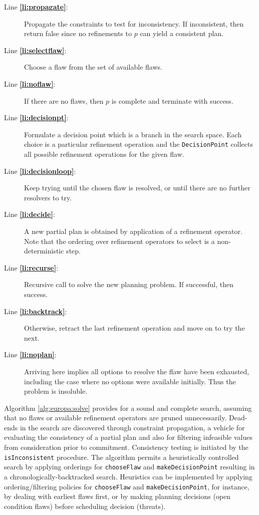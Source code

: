\begin{description}

\item[Line \textbf{\ref{li:propagate}}:] Propagate the constraints to
  test for inconsistency. If inconsistent, then return false since no
  refinements to $p$ can yield a consistent plan.

\item[Line \textbf{\ref{li:selectflaw}}:] Choose a flaw from the set
  of available flaws.

\item[Line \textbf{\ref{li:noflaw}}:] If there are no flaws, then $p$
  is complete and terminate with success.

\item[Line \textbf{\ref{li:decisionpt}}:] Formulate a decision point
  which is a branch in the search space. Each choice is a particular
  refinement operation and the \texttt{DecisionPoint} collects all
  possible refinement operations for the given flaw.

\item[Line \textbf{\ref{li:decisionloop}}:] Keep trying until the
  chosen flaw is resolved, or until there are no further resolvers to
  try.

\item[Line \textbf{\ref{li:decide}}:] A new partial plan is obtained
  by application of a refinement operator. Note that the ordering over
  refinement operators to select is a non-deterministic step.

\item[Line \textbf{\ref{li:recurse}}:] Recursive call to solve the
  new planning problem. If successful, then success.

\item[Line \textbf{\ref{li:backtrack}}:] Otherwise, retract the last
  refinement operation and move on to try the next.

\item[Line \textbf{\ref{li:noplan}}:] Arriving here implies all
  options to resolve the flaw have been exhausted, including the case
  where no options were available initially. Thus the problem is
  insoluble.

\end{description}

Algorithm \ref{alg:europa:solve} provides for a sound and complete
search, assuming that no flaws or available refinement operators are
pruned unnecessarily.  Dead-ends in the search are discovered through
constraint propagation, a vehicle for evaluating the consistency of a
partial plan and also for filtering infeasible values from
consideration prior to commitment. Consistency testing is initiated by
the \texttt{isInconsistent} procedure.  The algorithm permits a
heuristically controlled search by applying orderings for
\texttt{chooseFlaw} and \texttt{makeDecisionPoint} resulting in a
chronologically-backtracked search. Heuristics can be implemented by
applying ordering/filtering policies for \texttt{chooseFlaw} and
\texttt{makeDecisionPoint}, for instance, by dealing with earliest
flaws first, or by making planning decisions (open condition flaws)
before scheduling decision (threats).

